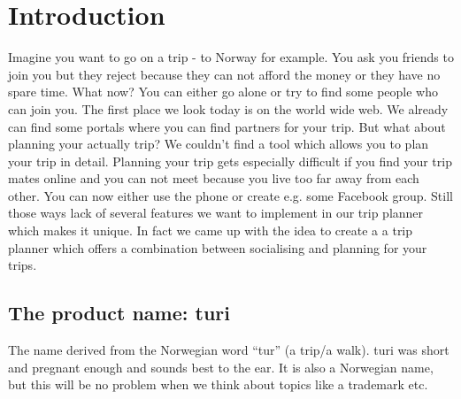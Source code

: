 \documentclass[a4paper]{article}
\begin{document}
\tableofcontents
\pagebreak


\section{Introduction}
Imagine you want to go on a trip - to Norway for example. You ask you friends to join you but they reject because they can not afford the money or they have no spare time. What now? You can either go alone or try to find some people who can join you. The first place we look today is on the world wide web. We already can find some portals where you can find partners for your trip. But what about planning your actually trip? We couldn’t find a tool which allows you to plan your trip in detail. Planning your trip gets especially difficult if you find your trip mates online and you can not meet because you live too far away from each other. You can now either use the phone or create e.g. some Facebook group. Still those ways lack of several features we want to implement in our trip planner which makes it unique. In fact we came up with the idea to create a a trip planner which offers a combination between socialising and planning for your trips.

\subsection{The product name: turi}
The name derived from the Norwegian word “tur” (a trip/a walk). turi was short and pregnant enough and sounds best to the ear. It is also a Norwegian name, but this will be no problem when we think about topics like a trademark etc.
\end{document}
